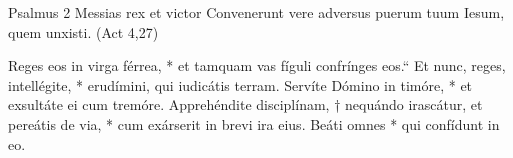 Psalmus 2
Messias rex et victor
Convenerunt vere adversus puerum tuum Iesum, quem unxisti.
(Act 4,27)

Reges eos in virga férrea, *
et tamquam vas fíguli confrínges eos.“
Et nunc, reges, intellégite, *
erudímini, qui iudicátis terram.
Servíte Dómino in timóre, *
et exsultáte ei cum tremóre.
Apprehéndite disciplínam, †
nequándo irascátur, et pereátis de via, *
cum exárserit in brevi ira eius.
Beáti omnes *
qui confídunt in eo.
